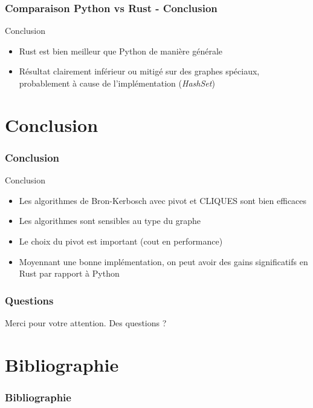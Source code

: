 \documentclass{beamer}
\begin{document}
\begin{frame}
\frametitle{Comparaison Python vs Rust - Conclusion}
\begin{block}{Conclusion}
\begin{itemize}
  \item Rust est bien meilleur que Python de manière générale
  \item Résultat clairement inférieur ou mitigé sur des graphes spéciaux, probablement à cause de l'implémentation (\emph{HashSet})
\end{itemize}
\end{block}
\end{frame}
\section{Conclusion}
\begin{frame}
\frametitle{Conclusion}
\begin{block}{Conclusion}
  \begin{itemize}
    \item Les algorithmes de Bron-Kerbosch avec pivot et CLIQUES sont bien efficaces
    \item Les algorithmes sont sensibles au type du graphe
    \item Le choix du pivot est important (cout en performance)
    \item Moyennant une bonne implémentation, on peut avoir des gains significatifs en Rust par rapport à Python
  \end{itemize}
\end{block}
\end{frame}

\begin{frame}
\frametitle{Questions}
Merci pour votre attention. Des questions ?
\end{frame}

\section{Bibliographie}
\begin{frame}[allowframebreaks]
\frametitle{Bibliographie}
\printbibliography
\end{frame}
\end{document}
